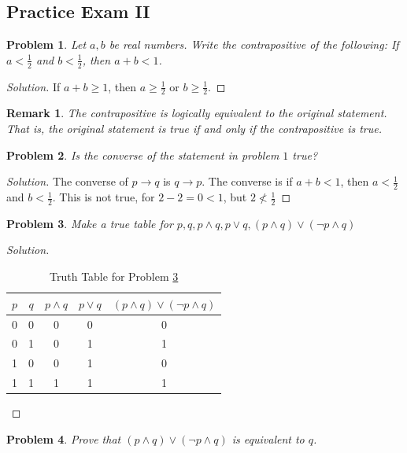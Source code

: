 \documentclass[oneside]{book}
\theoremstyle{mystyle}
\newtheorem{problem}{Problem}[section]
\newtheorem{remark}{Remark}[section]
\begin{document}
\subsection{Practice Exam II}
\begin{problem} Let $a,b$ be real numbers. Write the contrapositive of the following: If $a<\frac{1}{2}$ and $b< \frac{1}{2}$, then $a+b<1$. 
\end{problem}
\begin{proof}[Solution]
If $a+b \geq 1$, then $a\geq \frac{1}{2}$ or $b\geq \frac{1}{2}$.
\end{proof}
\begin{remark}
The contrapositive is logically equivalent to the original statement. That is, the original statement is true if and only if the contrapositive is true.
\end{remark}
\begin{problem}
Is the converse of the statement in problem $1$ true?
\end{problem}
\begin{proof}[Solution]
The converse of $p\rightarrow q$ is $q\rightarrow p$. The converse is if $a+b <1$, then $a<\frac{1}{2}$ and $b< \frac{1}{2}$. This is not true, for $2-2 = 0 < 1$, but $2\not<\frac{1}{2}$
\end{proof}
\begin{problem}
\label{problem:discrete_structures_practice_exam_2_problem_3}
Make a true table for $p,q,p\land q, p\lor q, (p\land q)\lor (\neg p\land q)$
\end{problem}
\begin{proof}[Solution]
\
\begin{table}[H]
    \centering
    \begin{tabular}{c c c c c} 
        \hline
        $p$ & $q$ & $p\land q$ & $p\lor q$ & $(p\land q)\lor(\neg p\land q)$ \\ [0.5ex] 
        \hline
        0 & 0 & 0 & 0 & 0\\ 
        0 & 1 & 0 & 1 & 1\\
        1 & 0 & 0 & 1 & 0\\
        1 & 1 & 1 & 1 & 1\\
        \hline
    \end{tabular}
    \caption{Truth Table for Problem \ref{problem:discrete_structures_practice_exam_2_problem_3}}
    \label{tab:discrete_structures_practice_exam_2_problem_3}
\end{table}
\end{proof}
\begin{problem}
Prove that $(p\land q)\lor(\neg p\land q)$ is equivalent to $q$.
\end{problem}
\end{document}
